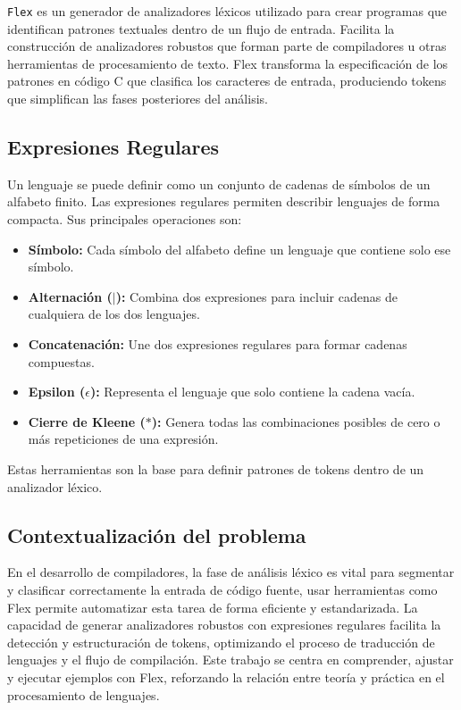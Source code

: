 \documentclass{article}
\begin{document}
\texttt{Flex} es un generador de analizadores léxicos utilizado para crear programas que identifican patrones textuales dentro de un flujo de entrada. Facilita la construcción de analizadores robustos que forman parte de compiladores u otras herramientas de procesamiento de texto. Flex transforma la especificación de los patrones en código C que clasifica los caracteres de entrada, produciendo tokens que simplifican las fases posteriores del análisis.
\subsection*{Expresiones Regulares}

Un lenguaje se puede definir como un conjunto de cadenas de símbolos de un alfabeto finito. Las expresiones regulares permiten describir lenguajes de forma compacta. Sus principales operaciones son:
\begin{itemize}
    \item \textbf{Símbolo:} Cada símbolo del alfabeto define un lenguaje que contiene solo ese símbolo.
    \item \textbf{Alternación ($|$):} Combina dos expresiones para incluir cadenas de cualquiera de los dos lenguajes.
    \item \textbf{Concatenación:} Une dos expresiones regulares para formar cadenas compuestas.
    \item \textbf{Epsilon ($\epsilon$):} Representa el lenguaje que solo contiene la cadena vacía.
    \item \textbf{Cierre de Kleene ($*$):} Genera todas las combinaciones posibles de cero o más repeticiones de una expresión.
\end{itemize}

Estas herramientas son la base para definir patrones de tokens dentro de un analizador léxico.


\subsection{Contextualización del problema}

En el desarrollo de compiladores, la fase de análisis léxico es vital para segmentar y clasificar correctamente la entrada de código fuente, usar herramientas como Flex permite automatizar esta tarea de forma eficiente y estandarizada. La capacidad de generar analizadores robustos con expresiones regulares facilita la detección y estructuración de tokens, optimizando el proceso de traducción de lenguajes y el flujo de compilación. Este trabajo se centra en comprender, ajustar y ejecutar ejemplos con Flex, reforzando la relación entre teoría y práctica en el procesamiento de lenguajes.
\end{document}
